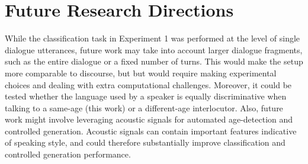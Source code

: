 
\section{Future Research Directions}

While the classification task in Experiment 1 was performed at the level of single dialogue utterances, future work may take into account larger dialogue fragments, such as the entire dialogue or a fixed number of turns. This would make the setup more comparable to discourse, but but would require making experimental choices and dealing with extra computational challenges. Moreover, it could be tested whether the language used by a speaker is equally discriminative when talking to a same-age (this work) or a different-age interlocutor. Also, future work might involve leveraging acoustic signals for automated age-detection and controlled generation. Acoustic signals can contain important features indicative of speaking style, and could therefore substantially improve classification and controlled generation performance.

